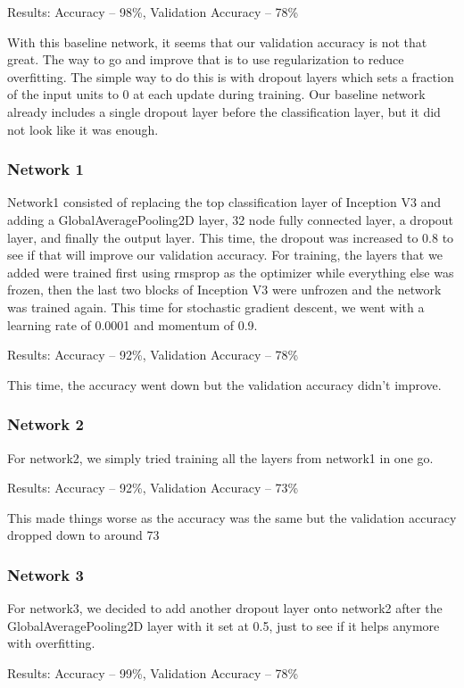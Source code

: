 Results: Accuracy – 98\%, Validation Accuracy – 78\%

With this baseline network, it seems that our validation accuracy is not that great. The way to go and improve that is to use regularization to reduce overfitting. The simple way to do this is with dropout layers which sets a fraction of the input units to 0 at each update during training. Our baseline network already includes a single dropout layer before the classification layer, but it did not look like it was enough.
\subsubsection{Network 1}

Network1 consisted of replacing the top classification layer of Inception V3 and adding a GlobalAveragePooling2D layer, 32 node fully connected layer, a dropout layer, and finally the output layer. This time, the dropout was increased to 0.8 to see if that will improve our validation accuracy. For training, the layers that we added were trained first using rmsprop as the optimizer while everything else was frozen, then the last two blocks of Inception V3 were unfrozen and the network was trained again. This time for stochastic gradient descent, we went with a learning rate of 0.0001 and momentum of 0.9.

Results: Accuracy – 92\%, Validation Accuracy – 78\%

This time, the accuracy went down but the validation accuracy didn’t improve.
\subsubsection{Network 2}

For network2, we simply tried training all the layers from network1 in one go.

Results: Accuracy – 92\%, Validation Accuracy – 73\%

This made things worse as the accuracy was the same but the validation accuracy dropped down to around 73%
\subsubsection{Network 3}

For network3, we decided to add another dropout layer onto network2 after the GlobalAveragePooling2D layer with it set at 0.5, just to see if it helps anymore with overfitting. 

Results: Accuracy – 99\%, Validation Accuracy – 78\%

